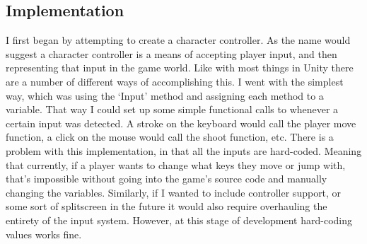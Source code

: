 \documentclass[10pt,twocolumn]{article}
\begin{document}
\subsection{Implementation}
I first began by attempting to create a character controller. As the name would suggest a character controller is a means of accepting player input, and then representing that input in the game world. Like with most things in Unity there are a number of different ways of accomplishing this. I went with the simplest way, which was using the ‘Input’ method and assigning each method to a variable. That way I could set up some simple functional calls to whenever a certain input was detected. A stroke on the keyboard would call the player move function, a click on the mouse would call the shoot function, etc. There is a  problem with this implementation, in that all the inputs are hard-coded. Meaning that currently, if a player wants to change what keys they move or jump with, that’s impossible without going into the game’s source code and manually changing the variables. Similarly, if I wanted to include controller support, or some sort of splitscreen in the future it would also require overhauling the entirety of the input system. However, at this stage of development hard-coding values works fine.
\end{document}
